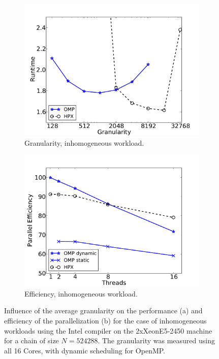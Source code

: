 \documentclass[10pt]{elsarticle}
\begin{document}
\begin{figure}
 \begin{subfigure}[b]{0.49\textwidth}
  \centering
  \includegraphics[width=\textwidth]{marvin_inhom_granularity.pdf}\hfill
  \caption{Granularity, inhomogeneous workload.} 
  \label{fig:inhom_granularity}
 \end{subfigure}
 \begin{subfigure}[b]{0.49\textwidth}
  \centering
  \includegraphics[width=\textwidth]{marvin_scaling_inhom_512K.pdf}\hfill
  \caption{Efficiency, inhomogeneous workload.} 
  \label{fig:inhom_512K}
 \end{subfigure}
 \caption{Influence of the average granularity on the performance (a) and efficiency of the parallelization (b) for the case of inhomogeneous workloads using the Intel compiler on the 2xXeonE5-2450 machine for a chain of size $N=524288$. The granularity was measured using all 16 Cores, with dynamic scheduling for OpenMP.}
 \label{fig:inhom_1}
\end{figure}
\end{document}
